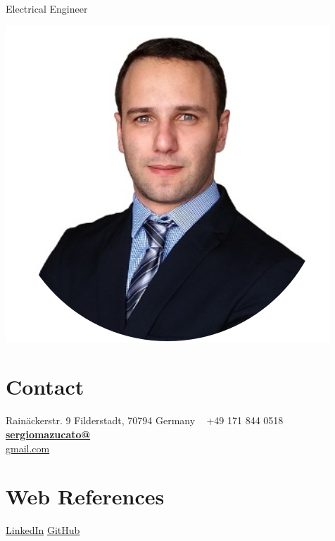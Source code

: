 \documentclass[]{friggeri-cv}
\begin{document}
      {Electrical Engineer}
      

\begin{aside}
  \includegraphics[scale=0.32]{img/linkedin_.png}
  \section{Contact}
    Rainäckerstr. 9
    Filderstadt, 70794
    Germany
    ~
    +49 171 844 0518
    \href{mailto:sergiomazucato@gmail.com}{\textbf{sergiomazucato@}\\gmail.com}
    ~
  \section{Web References}
    \href{https://www.linkedin.com/in/sergiomazucato/}{LinkedIn}
    \href{https://github.com/sergiomazucato}{GitHub}
    ~

\end{aside}
\end{document}
